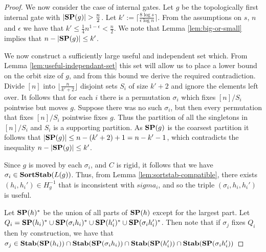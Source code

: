 \documentclass[../paper.tex]{subfiles}
\begin{document}
\begin{proof}
  We now consider the case of internal gates. Let $g$ be the topologically first
  internal gate with $\vert \text{\textbf{SP}}(g) \vert > \frac{n}{2}$. Let $k' := \lceil
  \frac{8 \log s}{\epsilon \log n} \rceil$. From the assumptions on $s$, $ n$
  and $\epsilon$ we have that $k' \leq \frac{1}{4}n^{1-\epsilon} < \frac{n}{2}$.
  We note that Lemma \ref{lem:big-or-small} implies that $n - \vert \text{\textbf{SP}}(g) \vert
  \leq k'$.
  
  We now construct a sufficiently large useful and independent set which. From
  Lemma \ref{lem:useful-independant-set} this set will allow us to place a lower
  bound on the orbit size of $g$, and from this bound we derive the required
  contradiction. Divide $[n]$ into $\lfloor \frac{n}{k' + 2} \rfloor$ disjoint
  sets $S_i$ of size $k' + 2$ and ignore the elements left over. It follows that
  for each $i$ there is a permutation $\sigma_i$ which fixes $[n] / S_i$
  pointwise but moves $g$. Suppose there was no such $\sigma_i$, but then every
  permutation that fixes $[n]/S_i$ pointwise fixes $g$. Thus the partition of
  all the singletons in $[n]/S_i$ and $S_i$ is a supporting partition. As
  $\text{\textbf{SP}}(g)$ is the coarsest partition it follows that $\vert \text{\textbf{SP}}(g) \vert \leq n
  - (k'+2) + 1 = n - k' - 1$, which contradicts the inequality $n - \vert \text{\textbf{SP}}(g)
  \vert \leq k'$.

  Since $g$ is moved by each $\sigma_i$, and $C$ is rigid, it follows that we
  have $\sigma_i \in \text{\textbf{SortStab}}(L(g))$. Thus, from Lemma
  \ref{lem:sortstab-compatible}, there exists $(h_i, h_i') \in H^{-1}_g$ that is
  inconsistent with $sigma_i$, and so the triple $(\sigma_i, h_i, h_i')$ is
  useful.

  Let $\text{\textbf{SP}} (h)^*$ be the union of all parts of $\text{\textbf{SP}}(h)$ except for the largest
  part. Let $Q_i = \text{\textbf{SP}}(h_i)^* \cup \text{\textbf{SP}}(\sigma_i h_i)^* \cup \text{\textbf{SP}} (h_i')^* \cup
  \text{\textbf{SP}} (\sigma_i h_i')^*$. Then note that if $\sigma_j$ fixes $Q_i$ then by
  construction, we have that $\sigma_j \in \text{\textbf{Stab}}(\text{\textbf{SP}}(h_i)) \cap
  \text{\textbf{Stab}}(\text{\textbf{SP}}(\sigma_i h_i)) \cap \text{\textbf{Stab}}(\text{\textbf{SP}}(h_i')) \cap \text{\textbf{Stab}}(\text{\textbf{SP}}(\sigma_i h_i'))$


\end{proof}
\end{document}
